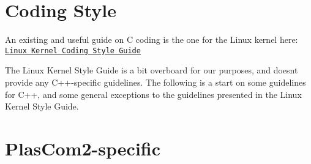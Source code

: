 \hypertarget{xpacc_coding_guide_General}{}\section{Coding Style}\label{xpacc_coding_guide_General}
An existing and useful guide on C coding is the one for the Linux kernel here\+: \href{http://elixir.free-electrons.com/linux/latest/source/Documentation/process/coding-style.rst}{\tt Linux Kernel Coding Style Guide}

The Linux Kernel Style Guide is a bit overboard for our purposes, and doesn\textquotesingle{}t provide any C++-\/specific guidelines. The following is a start on some guidelines for C++, and some general exceptions to the guidelines presented in the Linux Kernel Style Guide.\hypertarget{xpacc_coding_guide_PlasCom2-specific}{}\section{Plas\+Com2-\/specific}\label{xpacc_coding_guide_PlasCom2-specific}

